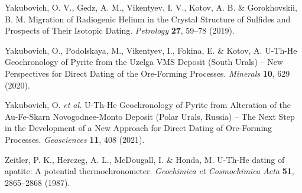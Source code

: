 \documentclass[gchron, manuscript]{copernicus}
\begin{document}
\begin{thebibliography}{}
Yakubovich, O. V., Gedz, A. M., Vikentyev, I. V., Kotov, A. B. \& Gorokhovskii, B. M. Migration of Radiogenic Helium in the Crystal Structure of Sulfides and Prospects of Their Isotopic Dating. \emph{Petrology} \textbf{27}, 59--78 (2019).

Yakubovich, O., Podolskaya, M., Vikentyev, I., Fokina, E. \& Kotov, A. U-Th-He Geochronology of Pyrite from the Uzelga VMS Deposit (South Urals) -- New Perspectives for Direct Dating of the Ore-Forming Processes. \emph{Minerals} \textbf{10}, 629 (2020).

Yakubovich, O. \emph{et al.} U-Th-He Geochronology of Pyrite from Alteration of the Au-Fe-Skarn Novogodnee-Monto Deposit (Polar Urals, Russia) -- The Next Step in the Development of a New Approach for Direct Dating of Ore-Forming Processes. \emph{Geosciences} \textbf{11}, 408 (2021).

Zeitler, P. K., Herczeg, A. L., McDougall, I. \& Honda, M. U-Th-He dating of apatite: A potential thermochronometer. \emph{Geochimica et Cosmochimica Acta} \textbf{51}, 2865--2868 (1987).

\end{thebibliography}
\end{document}
